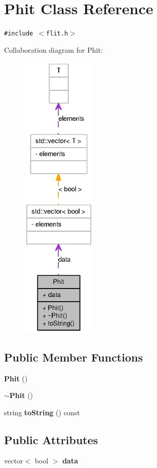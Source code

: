 \section{Phit Class Reference}
\label{classPhit}
{\tt \#include $<$flit.h$>$}

Collaboration diagram for Phit:\nopagebreak
\begin{figure}[H]
\begin{center}
\leavevmode
\includegraphics[height=400pt]{classPhit__coll__graph}
\end{center}
\end{figure}
\subsection*{Public Member Functions}
\begin{CompactItemize}
\item 
{\bf Phit} ()
\item 
{\bf $\sim$Phit} ()
\item 
string {\bf toString} () const 
\end{CompactItemize}
\subsection*{Public Attributes}
\begin{CompactItemize}
\item 
vector$<$ bool $>$ {\bf data}
\end{CompactItemize}


